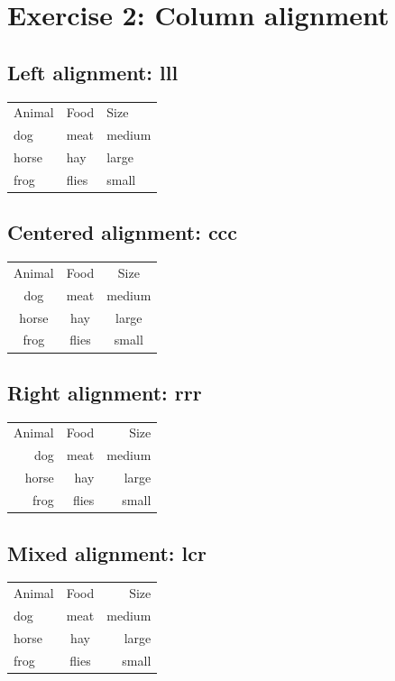 \documentclass{article}
\begin{document}
\section*{Exercise 2: Column alignment}

\subsection*{Left alignment: lll}

\begin{tabular}{lll}
Animal & Food & Size \\
dog & meat & medium \\
horse & hay & large \\
frog & flies & small \\
\end{tabular}

\subsection*{Centered alignment: ccc}

\begin{tabular}{ccc}
Animal & Food & Size \\
dog & meat & medium \\
horse & hay & large \\
frog & flies & small \\
\end{tabular}

\subsection*{Right alignment: rrr}

\begin{tabular}{rrr}
Animal & Food & Size \\
dog & meat & medium \\
horse & hay & large \\
frog & flies & small \\
\end{tabular}

\subsection*{Mixed alignment: lcr}

\begin{tabular}{lcr}
Animal & Food & Size \\
dog & meat & medium \\
horse & hay & large \\
frog & flies & small \\
\end{tabular}
\end{document}

